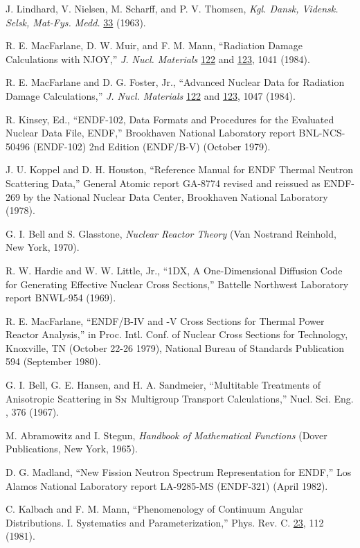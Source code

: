 \documentclass[11pt,twoside]{NJOYMan}
\begin{document}
\begin{thebibliography}{99}
\begin{singlespace}
 J. Lindhard, V. Nielsen, M. Scharff, and P. V. Thomsen,
   {\it Kgl. Dansk, Vidensk. Selsk, Mat-Fys. Medd.} \underline{33} (1963).

 R. E. MacFarlane, D. W. Muir, and F. M. Mann,
   ``Radiation Damage Calculations with NJOY,''
   {\it J. Nucl. Materials} \underline{122} and \underline{123},
   1041 (1984).

 R. E. MacFarlane and D. G. Foster, Jr.,
   ``Advanced Nuclear Data for Radiation Damage Calculations,''
   {\it J. Nucl. Materials} \underline{122} and \underline{123},
   1047 (1984).

 R. Kinsey, Ed., ``ENDF-102, Data Formats and Procedures
   for the Evaluated Nuclear Data File, ENDF,'' Brookhaven National
   Laboratory report BNL-NCS-50496 (ENDF-102) 2nd Edition
   (ENDF/B-V) (October 1979).

 J. U. Koppel and D. H. Houston, ``Reference Manual
   for ENDF Thermal Neutron Scattering Data,'' General Atomic report
   GA-8774 revised and reissued as ENDF-269 by the National Nuclear Data
   Center, Brookhaven National Laboratory (1978).

 G. I. Bell and S. Glasstone, {\it Nuclear Reactor Theory}
  (Van Nostrand Reinhold, New York, 1970).

 R. W. Hardie and W. W. Little, Jr., ``1DX, A One-Dimensional
  Diffusion Code for Generating Effective Nuclear Cross Sections,''
  Battelle Northwest Laboratory report BNWL-954 (1969).

 R. E. MacFarlane, ``ENDF/B-IV and -V Cross Sections for Thermal
  Power Reactor Analysis,'' in Proc. Intl. Conf. of Nuclear Cross Sections
  for Technology, Knoxville, TN (October 22-26 1979), National Bureau of
  Standards Publication 594 (September 1980).

 G. I. Bell, G. E. Hansen, and H. A. Sandmeier, ``Multitable
  Treatments of Anisotropic Scattering in S$_{\rm N}$ Multigroup
  Transport Calculations,'' Nucl. Sci. Eng. , 376 (1967).

  M. Abramowitz and I. Stegun, {\it Handbook of Mathematical
  Functions} (Dover Publications, New York, 1965).

  D. G. Madland, ``New Fission Neutron Spectrum
  Representation for ENDF,'' Los Alamos National Laboratory
  report LA-9285-MS (ENDF-321) (April 1982).

 C. Kalbach and F. M. Mann, ``Phenomenology of Continuum
   Angular Distributions. I. Systematics and Parameterization,''
   Phys. Rev. C. \underline{23}, 112 (1981).


\end{singlespace}
\end{thebibliography}
\end{document}
